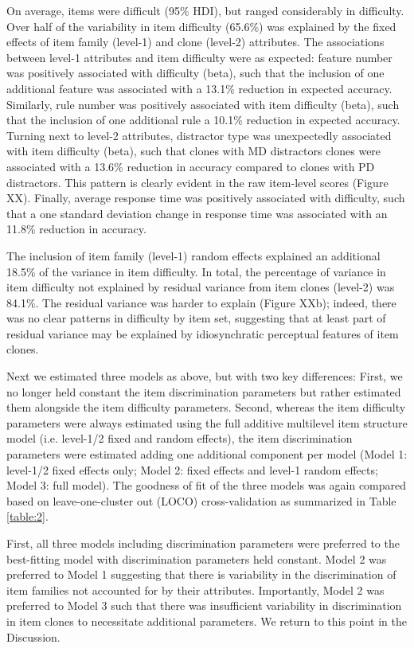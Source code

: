 \documentclass[a4paper,man,natbib]{apa6}
\begin{document}
On average, items were difficult (95\% HDI), but ranged considerably in difficulty. Over half of the variability in item difficulty (65.6\%) was explained by the fixed effects of item family (level-1) and clone (level-2) attributes. The associations between level-1 attributes and item difficulty were as expected: feature number was positively associated with difficulty (beta), such that the inclusion of one additional feature was associated with a 13.1\% reduction in expected accuracy. Similarly, rule number was positively associated with item difficulty (beta), such that the inclusion of one additional rule a 10.1\% reduction in expected accuracy. Turning next to level-2 attributes, distractor type was unexpectedly associated with item difficulty (beta), such that clones with MD distractors clones were associated with a 13.6\% reduction in accuracy compared to clones with PD distractors. This pattern is clearly evident in the raw item-level scores (Figure XX). Finally, average response time was positively associated with difficulty, such that a one standard deviation change in response time was associated with an 11.8\% reduction in accuracy. 

The inclusion of item family (level-1) random effects explained an additional 18.5\% of the variance in item difficulty. In total, the percentage of variance in item difficulty not explained by residual variance from item clones (level-2) was 84.1\%. The residual variance was harder to explain (Figure XXb); indeed, there was no clear patterns in difficulty by item set, suggesting that at least part of residual variance may be explained by idiosynchratic perceptual features of item clones. 

Next we estimated three models as above, but with two key differences: First, we no longer held constant the item discrimination parameters but rather estimated them alongside the item difficulty parameters. Second, whereas the item difficulty parameters were always estimated using the full additive multilevel item structure model (i.e. level-1/2 fixed and random effects), the item discrimination parameters were estimated adding one additional component per model (Model 1: level-1/2 fixed effects only; Model 2: fixed effects and level-1 random effects; Model 3: full model). The goodness of fit of the three models was again compared based on leave-one-cluster out (LOCO) cross-validation as summarized in Table \ref{table:2}. 

First, all three models including discrimination parameters were preferred to the best-fitting model with discrimination parameters held constant. Model 2 was preferred to Model 1 suggesting that there is variability in the discrimination of item families not accounted for by their attributes. Importantly, Model 2 was preferred to Model 3 such that there was insufficient variability in discrimination in item clones to necessitate additional parameters. We return to this point in the Discussion.
\end{document}
